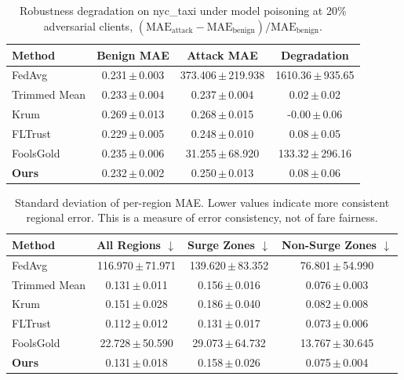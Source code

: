 \begin{table}[t]
\centering
\scriptsize
\caption{Robustness degradation on nyc_taxi under model poisoning at 20\% adversarial clients, $(\mathrm{MAE}_{\mathrm{attack}}-\mathrm{MAE}_{\mathrm{benign}})/\mathrm{MAE}_{\mathrm{benign}}$.}
\label{tab:degradation}
\begin{tabular}{lccc}
\toprule
\textbf{Method} & \textbf{Benign MAE} & \textbf{Attack MAE} & \textbf{Degradation} \\
\midrule
FedAvg & 0.231\,$\pm$\,0.003 & 373.406\,$\pm$\,219.938 & 1610.36\,$\pm$\,935.65 \\
Trimmed Mean & 0.233\,$\pm$\,0.004 & 0.237\,$\pm$\,0.004 & 0.02\,$\pm$\,0.02 \\
Krum & 0.269\,$\pm$\,0.013 & 0.268\,$\pm$\,0.015 & -0.00\,$\pm$\,0.06 \\
FLTrust & 0.229\,$\pm$\,0.005 & 0.248\,$\pm$\,0.010 & 0.08\,$\pm$\,0.05 \\
FoolsGold & 0.235\,$\pm$\,0.006 & 31.255\,$\pm$\,68.920 & 133.32\,$\pm$\,296.16 \\
\textbf{Ours} & 0.232\,$\pm$\,0.002 & 0.250\,$\pm$\,0.013 & 0.08\,$\pm$\,0.06 \\
\bottomrule
\end{tabular}
\end{table}

\begin{table}[t]
\centering
\scriptsize
\caption{Standard deviation of per-region MAE. Lower values indicate more consistent regional error. This is a measure of error consistency, not of fare fairness.}
\label{tab:fairness}
\renewcommand{\arraystretch}{1.1}
\begin{tabular}{lccc}
\toprule
\textbf{Method} & \textbf{All Regions $\downarrow$} & \textbf{Surge Zones $\downarrow$} & \textbf{Non-Surge Zones $\downarrow$} \\
\midrule
FedAvg & 116.970\,$\pm$\,71.971 & 139.620\,$\pm$\,83.352 & 76.801\,$\pm$\,54.990 \\
Trimmed Mean & 0.131\,$\pm$\,0.011 & 0.156\,$\pm$\,0.016 & 0.076\,$\pm$\,0.003 \\
Krum & 0.151\,$\pm$\,0.028 & 0.186\,$\pm$\,0.040 & 0.082\,$\pm$\,0.008 \\
FLTrust & 0.112\,$\pm$\,0.012 & 0.131\,$\pm$\,0.017 & 0.073\,$\pm$\,0.006 \\
FoolsGold & 22.728\,$\pm$\,50.590 & 29.073\,$\pm$\,64.732 & 13.767\,$\pm$\,30.645 \\
\textbf{Ours} & 0.131\,$\pm$\,0.018 & 0.158\,$\pm$\,0.026 & 0.075\,$\pm$\,0.004 \\
\bottomrule
\end{tabular}
\end{table}

